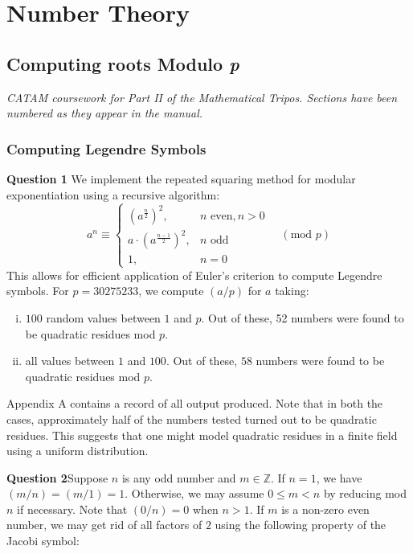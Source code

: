 \documentclass[12pt]{article}
\begin{document}
\setcounter{section}{14}
\section{Number Theory}
\setcounter{subsection}{5}
\subsection{Computing roots Modulo \textit{p}}
\emph{CATAM coursework for Part II of the Mathematical Tripos. Sections have
been numbered as they appear in the manual.}

\setcounter{subsubsection}{1}
\subsubsection{Computing Legendre Symbols}
\textbf{Question 1} \quad 
We implement the repeated squaring method for modular exponentiation using a
recursive algorithm: 
\[a^n \equiv \begin{cases}
    (a^{\frac{n}{2}})^2, &n\text{ even}, n>0\\
    a\cdot (a^{\frac{n-1}{2}})^2, &n\text{ odd}\\
    1, &n = 0
\end{cases} \quad (\text{mod } p)\]
This allows for efficient application of Euler's criterion to compute Legendre
symbols. For \(p=30275233\), we compute \((a/p)\) for \(a\) taking:
\begin{enumerate}[(i)]
    \item \(100\) random values between \(1\) and \(p\). Out of these, 52
        numbers were found to be quadratic residues mod \(p\).
    \item all values between \(1\) and \(100\). Out of these, \(58\) numbers
        were found to be quadratic residues mod \(p\).
\end{enumerate}
Appendix A contains a record of all output produced. Note that in both the
cases, approximately half of the numbers tested turned out to be quadratic
residues. This suggests that one might model quadratic residues in a finite
field using a uniform distribution.

 \hfill

\textbf{Question 2}\quad Suppose \(n\) is any odd number and \(m\in
\mathbb{Z}\).  If \(n=1\), we have \((m/n)=(m/1)=1\). Otherwise, we may assume
\(0\leq m < n\) by reducing mod \(n\) if necessary. Note that \((0/n)=0\) when
\(n>1\). If \(m\) is a non-zero even number, we may get rid of
all factors of \(2\) using the following property of the Jacobi symbol:
\end{document}
